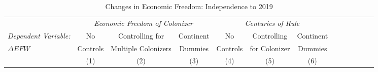 \begin{sidewaystable}[h!]
\begin{threeparttable}
\begin{center}
\begin{minipage}{\textwidth}
\small
\caption{Changes in Economic Freedom: Independence to 2019}
\label{tab:TabB5}
\begin{tabular*}{\textwidth}{@{\extracolsep{\fill}}lcccccccccccc@{\extracolsep{\fill}}}
\hline\hline
    
             &\multicolumn{3}{c}{\textit{Economic Freedom of Colonizer}}
            &\multicolumn{3}{c}{\textit{Centuries of Rule}}\\
            \cmidrule{2-4}\cmidrule{5-7}
            \textit{Dependent Variable:}
            &\multicolumn{1}{c}{No}
            &\multicolumn{1}{c}{Controlling for}
            &\multicolumn{1}{c}{Continent}
            &\multicolumn{1}{c}{No}
            &\multicolumn{1}{c}{Controlling}
            &\multicolumn{1}{c}{Continent}\\
            $\Delta EFW$
            &\multicolumn{1}{c}{Controls}
            &\multicolumn{1}{c}{Multiple Colonizers}
            &\multicolumn{1}{c}{Dummies}
            &\multicolumn{1}{c}{Controls}
            &\multicolumn{1}{c}{for Colonizer}
            &\multicolumn{1}{c}{Dummies}\\
            &\multicolumn{1}{c}{(1)}
            &\multicolumn{1}{c}{(2)}
            &\multicolumn{1}{c}{(3)}
            &\multicolumn{1}{c}{(4)}
            &\multicolumn{1}{c}{(5)}
            &\multicolumn{1}{c}{(6)}\\
\hline




\end{tabular*}
\end{minipage}
\end{center}
\end{threeparttable}
\end{sidewaystable}

